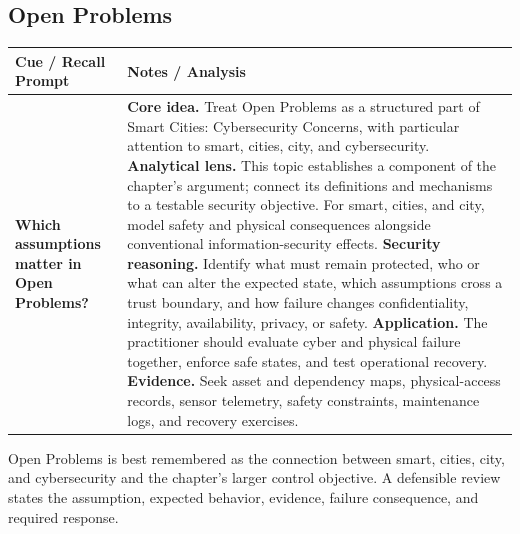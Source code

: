 \documentclass[11pt]{article}
\newcommand{\CornellHeader}{%
\rowcolor{Navy}\color{white}\bfseries Cue / Recall Prompt & \color{white}\bfseries Notes / Analysis\\\hline}
\newcommand{\CornellRow}[2]{%
\cellcolor{CueGray}\RaggedRight\textbf{#1} & \RaggedRight #2\\\hline}
\begin{document}
\subsection*{Open Problems}
\begin{longtable}{>{\RaggedRight\arraybackslash}p{}|>{\RaggedRight\arraybackslash}p{}}
\CornellHeader
\CornellRow{Which assumptions matter in Open Problems?}{\textbf{Core idea.} Treat Open Problems as a structured part of Smart Cities: Cybersecurity Concerns, with particular attention to smart, cities, city, and cybersecurity. \textbf{Analytical lens.} This topic establishes a component of the chapter's argument; connect its definitions and mechanisms to a testable security objective. For smart, cities, and city, model safety and physical consequences alongside conventional information-security effects. \textbf{Security reasoning.} Identify what must remain protected, who or what can alter the expected state, which assumptions cross a trust boundary, and how failure changes confidentiality, integrity, availability, privacy, or safety. \textbf{Application.} The practitioner should evaluate cyber and physical failure together, enforce safe states, and test operational recovery. \textbf{Evidence.} Seek asset and dependency maps, physical-access records, sensor telemetry, safety constraints, maintenance logs, and recovery exercises.}
\end{longtable}
\begin{topicsummary}
Open Problems is best remembered as the connection between smart, cities, city, and cybersecurity and the chapter's larger control objective. A defensible review states the assumption, expected behavior, evidence, failure consequence, and required response.
\end{topicsummary}
\end{document}
